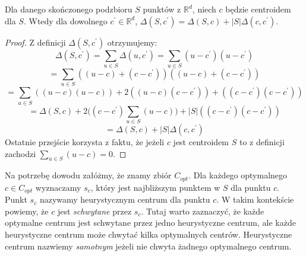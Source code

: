 \begin{lemma}{\cite{Arya2004LocalSH}}
    Dla danego skończonego podzbioru $S$ punktów z $\mathbb{R}^d$, niech $c$ będzie centroidem dla $S$. Wtedy dla dowolnego $c^{'} \in \mathbb{R}^d$, $\Delta(S, c^{'}) = \Delta(S, c) + |S|\Delta(c, c^{'})$.
\end{lemma}
\begin{proof}
    Z definicji $\Delta(S, c^{'})$ otrzymujemy:
    \begin{equation}
        \Delta(S, c^{'}) = \sum_{u \in S} \Delta(u, c^{'}) =  \sum_{u \in S} (u - c^{'}) (u - c^{'})
    \end{equation}
    \begin{equation}
         = \sum_{u \in S} ((u - c) + (c - c^{'})) ((u - c) + (c - c^{'}))
    \end{equation}
    \begin{equation}
        = \sum_{u \in S} ((u - c)(u - c)) + 2((u - c)(c - c^{'})) + ((c - c^{'})(c - c^{'}))
    \end{equation}
    \begin{equation}
        = \Delta(S, c) + 2\Big( (c - c^{'}) \sum_{u \in S} (u - c) \Big) + |S|((c - c^{'})(c - c^{'}))
    \end{equation}
    \begin{equation}
        = \Delta(S, c) + |S|\Delta(c,c^{'})
    \end{equation}
    Ostatnie przejście korzysta z faktu, że jeżeli $c$ jest centroidem $S$ to z definicji zachodzi $\sum_{u \in S} (u - c) = 0$.
\end{proof}

\noindent
Na potrzebę dowodu załóżmy, że znamy zbiór $C_{opt}$.
Dla każdego optymalnego $c \in C_{opt}$ wyznaczamy $s_{c}$, który jest najbliższym punktem w $S$ dla punktu $c$.
Punkt $s_{c}$ nazywamy heurystycznym centrum dla punktu $c$.
W takim kontekście powiemy, że $c$ jest \textit{schwytane} przez $s_{c}$.
Tutaj warto zaznaczyć, że każde optymalne centrum jest schwytane przez jedno heurystyczne centrum, ale każde heurystyczne centrum może chwytać kilka optymalnych centrów.
Heurystyczne centrum nazwiemy \textit{samotnym} jeżeli nie chwyta żadnego optymalnego centrum.

